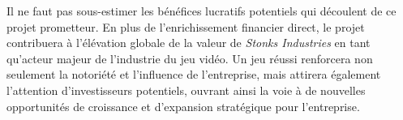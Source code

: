 Il ne faut pas sous-estimer les bénéfices lucratifs potentiels qui découlent de ce projet prometteur. 
En plus de l'enrichissement financier direct, le projet contribuera à l'élévation globale de la valeur de \textit{Stonks Industries} en tant qu'acteur majeur de l'industrie du jeu vidéo. 
Un jeu réussi renforcera non seulement la notoriété et l'influence de l'entreprise, mais attirera également l'attention d'investisseurs potentiels, ouvrant ainsi la voie à de nouvelles opportunités de croissance et d'expansion stratégique pour l'entreprise.

